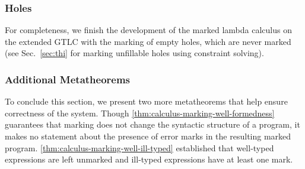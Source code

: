 \subsubsection{Holes}
For completeness, we finish the development of the marked lambda calculus on the extended GTLC with
the marking of empty holes, which are never marked (see Sec.~\ref{sec:thi} for marking unfillable holes using constraint solving).
%
\begin{mathpar}

  
\end{mathpar}

\subsubsection{Additional Metatheorems}
To conclude this section, we present two more metatheorems that help ensure correctness of the
system. Though \cref{thm:calculus-marking-well-formedness} guarantees that marking does not change
the syntactic structure of a program, it makes no statement about the presence of error marks in the
resulting marked program. 
\cref{thm:calculus-marking-well-ill-typed} established that well-typed expressions are left unmarked and ill-typed expressions have at least one mark.

